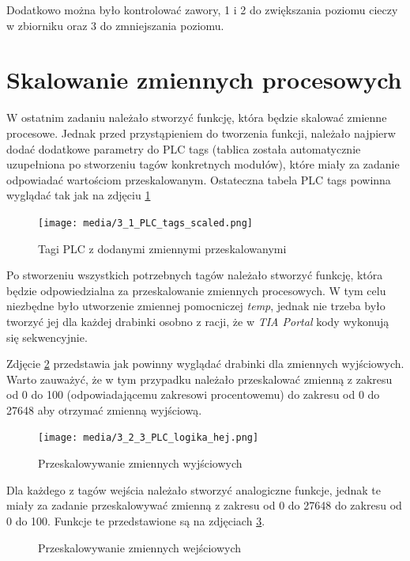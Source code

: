\documentclass{article}
\begin{document}
Dodatkowo można było kontrolować zawory, 1 i 2 do zwiększania poziomu cieczy w zbiorniku oraz 3 do zmniejszania poziomu. 

\newpage
\section{Skalowanie zmiennych procesowych}
W ostatnim zadaniu należało stworzyć funkcję, która będzie skalować zmienne procesowe. Jednak przed przystąpieniem do tworzenia funkcji, należało najpierw dodać dodatkowe parametry do PLC tags (tablica została automatycznie uzupełniona po stworzeniu tagów konkretnych modułów), które miały za zadanie odpowiadać wartościom przeskalowanym. Ostateczna tabela PLC tags powinna wyglądać tak jak na zdjęciu \ref{fig:zdj10}

\begin{figure}[H]
    \centering
    \texttt{[image: media/3\_1\_PLC\_tags\_scaled.png]}
    \caption{Tagi PLC z dodanymi zmiennymi przeskalowanymi}
    \label{fig:zdj10}
\end{figure}


Po stworzeniu wszystkich potrzebnych tagów należało stworzyć funkcję, która będzie odpowiedzialna za przeskalowanie zmiennych procesowych. W tym celu niezbędne było utworzenie zmiennej pomocniczej \textit{temp}, jednak nie trzeba było tworzyć jej dla każdej drabinki osobno z racji, że w \textit{TIA Portal} kody wykonują się sekwencyjnie.

\vspace{1em}
Zdjęcie \ref{fig:zdj13} przedstawia jak powinny wyglądać drabinki dla zmiennych wyjściowych. Warto zauważyć, że w tym przypadku należało przeskalować zmienną z zakresu od 0 do 100 (odpowiadającemu zakresowi procentowemu) do zakresu od 0 do 27648 aby otrzymać zmienną wyjściową. 


\begin{figure}[H]
    \centering
    \texttt{[image: media/3\_2\_3\_PLC\_logika\_hej.png]}
    \caption{Przeskalowywanie zmiennych wyjściowych}
    \label{fig:zdj13}
\end{figure}

\newpage
Dla każdego z tagów wejścia należało stworzyć analogiczne funkcje, jednak te miały za zadanie przeskalowywać zmienną z zakresu od 0 do 27648 do zakresu od 0 do 100. Funkcje te przedstawione są na zdjęciach \ref{fig:main420}.
\begin{figure}[H]
    \centering
    \caption{Przeskalowywanie zmiennych wejściowych}
    \label{fig:main420}
\end{figure}
\end{document}
